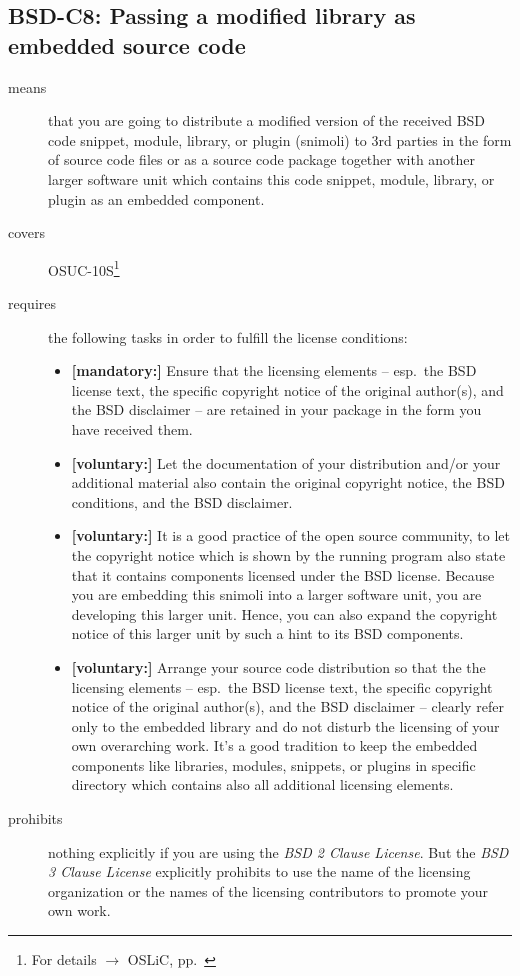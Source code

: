 \subsection{BSD-C8: Passing a modified library as embedded source code}
\label{OSUC-10S-BSD}
\begin{description}
\item[means] that you are going to distribute a modified version of the received
BSD code snippet, module, library, or plugin (snimoli) to 3rd parties in the
form of source code files or as a source code package together with another
larger software unit which contains this code snippet, module, library, or
plugin as an embedded component.
\item[covers] OSUC-10S\footnote{For details $\rightarrow$ OSLiC, pp.\
\pageref{OSUC-10S-DEF}}
\item[requires] the following tasks in order to fulfill the license conditions:
\begin{itemize}
  \item \textbf{[mandatory:]} Ensure that the licensing elements -- esp.\ the
  BSD license text, the specific copyright notice of the original author(s), and
  the BSD disclaimer -- are retained in your package in the form you have
  received them.
  \item \textbf{[voluntary:]} Let the documentation of your distribution
  and/or your additional material also contain the original copyright notice, the
  BSD conditions, and the BSD disclaimer.
 \item \textbf{[voluntary:]} It is a good practice of the open source
  community, to let the copyright notice which is shown by the running program
  also state that it contains components licensed under the BSD license. Because
  you are embedding this snimoli into a larger software unit, you are
  developing this larger unit. Hence, you can also expand the copyright notice
  of this larger unit by such a hint to its BSD components.
  
  \item \textbf{[voluntary:]} Arrange your source code distribution so that the
  the licensing elements -- esp.\ the BSD license text, the specific copyright
  notice of the original author(s), and the BSD disclaimer -- clearly refer
  only to the embedded library and do not disturb the licensing of your own
  overarching work. It's a good tradition to keep the embedded components like
  libraries, modules, snippets, or plugins in specific directory which contains
  also all additional licensing elements.
  
\end{itemize}

\item[prohibits] nothing explicitly if you are using the \emph{BSD 2 Clause
License}. But the \emph{BSD 3 Clause License} explicitly prohibits to use the
name of the licensing organization or the names of the licensing contributors to
promote your own work.

\end{description}


